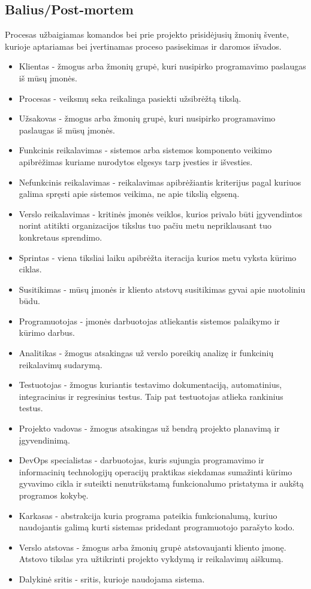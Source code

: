 \documentclass{VUMIFPSkursinis}
\begin{document}
	\subsection{Balius/Post-mortem}
	Procesas užbaigiamas komandos bei prie projekto prisidėjusių žmonių švente, kurioje aptariamas bei įvertinamas proceso pasisekimas ir daromos išvados.
	\begin{itemize}
		\item{Klientas - žmogus arba žmonių grupė, kuri nusipirko programavimo paslaugas iš mūsų įmonės.}
		\item{Procesas - veiksmų seka reikalinga pasiekti užsibrėžtą tikslą.}
		\item{Užsakovas - žmogus arba žmonių grupė, kuri nusipirko programavimo paslaugas iš mūsų įmonės.}
		\item{Funkcinis reikalavimas - sistemos arba sistemos komponento veikimo apibrėžimas kuriame nurodytos elgesys tarp įvesties ir išvesties.}
		\item{Nefunkcinis reikalavimas - reikalavimas apibrėžiantis kriterijus pagal kuriuos galima spręsti apie sistemos veikima, ne apie tikslią elgseną.}
		\item{Verslo reikalavimas - kritinės įmonės veiklos, kurios privalo būti įgyvendintos norint atitikti organizacijos tikslus tuo pačiu metu nepriklausant tuo konkretaus sprendimo.}
		\item{Sprintas - viena tiksliai laiku apibrėžta iteracija kurios metu vyksta kūrimo ciklas.}
		\item{Susitikimas - mūsų įmonės ir kliento atstovų susitikimas gyvai apie nuotoliniu būdu.}
		\item{Programuotojas - įmonės darbuotojas atliekantis sistemos palaikymo ir kūrimo darbus.}
		\item{Analitikas - žmogus atsakingas už verslo poreikių analizę ir funkcinių reikalavimų sudarymą.}
		\item{Testuotojas - žmogus kuriantis testavimo dokumentaciją, automatinius, integracinius ir regresinius testus. Taip pat testuotojas atlieka rankinius testus.}
		\item{Projekto vadovas - žmogus atsakingas už bendrą projekto planavimą ir įgyvendinimą.}
		\item{DevOps specialistas - darbuotojas, kuris sujungia programavimo ir informacinių technologijų operacijų praktikas siekdamas sumažinti kūrimo gyvavimo cikla ir suteikti nenutrūkstamą funkcionalumo pristatyma ir aukštą programos kokybę.}
		\item{Karkasas - abstrakcija kuria programa pateikia funkcionalumą, kuriuo naudojantis galimą kurti sistemas pridedant programuotojo parašyto kodo.}
		\item{Verslo atstovas - žmogus arba žmonių grupė atstovaujanti kliento įmonę. Atstovo tikslas yra užtikrinti projekto vykdymą ir reikalavimų aiškumą.}
		\item{Dalykinė sritis - sritis, kurioje naudojama sistema.}
	\end{itemize}
\end{document}
